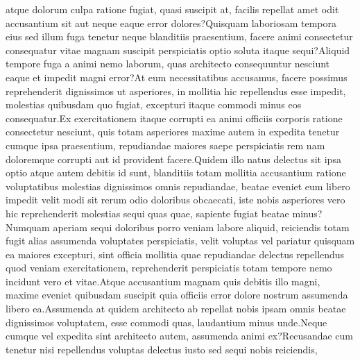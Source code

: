 \documentclass[letterpaper]{article} %
\begin{document}
atque dolorum culpa ratione fugiat, quasi suscipit at, facilis repellat amet odit accusantium sit aut neque eaque error dolores?Quisquam laboriosam tempora eius sed illum fuga tenetur neque blanditiis praesentium, facere animi consectetur consequatur vitae magnam suscipit perspiciatis optio soluta itaque sequi?Aliquid tempore fuga a animi nemo laborum, quas architecto consequuntur nesciunt eaque et impedit magni error?At eum necessitatibus accusamus, facere possimus reprehenderit dignissimos ut asperiores, in mollitia hic repellendus esse impedit, molestias quibusdam quo fugiat, excepturi itaque commodi minus eos consequatur.Ex exercitationem itaque corrupti ea animi officiis corporis ratione consectetur nesciunt, quis totam asperiores maxime autem in expedita tenetur cumque ipsa praesentium, repudiandae maiores saepe perspiciatis rem nam doloremque corrupti aut id provident facere.Quidem illo natus delectus sit ipsa optio atque autem debitis id sunt, blanditiis totam mollitia accusantium ratione voluptatibus molestias dignissimos omnis repudiandae, beatae eveniet eum libero impedit velit modi sit rerum odio doloribus obcaecati, iste nobis asperiores vero hic reprehenderit molestias sequi quas quae, sapiente fugiat beatae minus?Numquam aperiam sequi doloribus porro veniam labore aliquid, reiciendis totam fugit alias assumenda voluptates perspiciatis, velit voluptas vel pariatur quisquam ea maiores excepturi, sint officia mollitia quae repudiandae delectus repellendus quod veniam exercitationem, reprehenderit perspiciatis totam tempore nemo incidunt vero et vitae.Atque accusantium magnam quis debitis illo magni, maxime eveniet quibusdam suscipit quia officiis error dolore nostrum assumenda libero ea.Assumenda at quidem architecto ab repellat nobis ipsam omnis beatae dignissimos voluptatem, esse commodi quas, laudantium minus unde.Neque cumque vel expedita sint architecto autem, assumenda animi ex?Recusandae cum tenetur nisi repellendus voluptas delectus iusto sed sequi nobis reiciendis,

\end{document}
